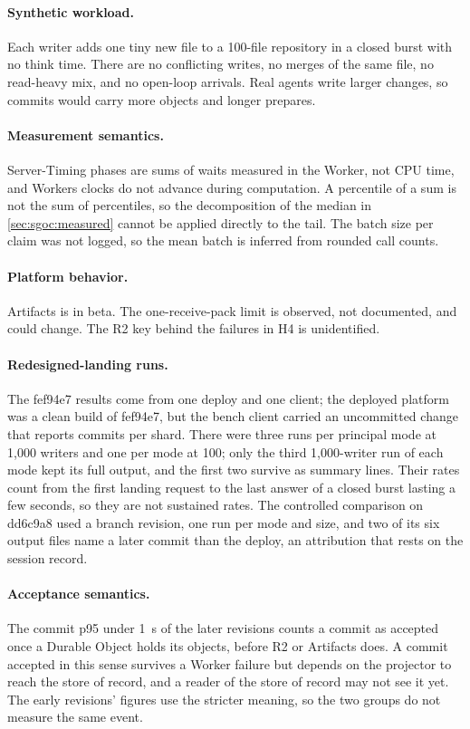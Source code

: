 \documentclass[11pt,letterpaper]{article}
\theoremstyle{definition}
\theoremstyle{remark}
\begin{document}
\paragraph{Synthetic workload.} Each writer adds one tiny new file to a 100-file repository in a closed burst with no think time. There are no conflicting writes, no merges of the same file, no read-heavy mix, and no open-loop arrivals. Real agents write larger changes, so commits would carry more objects and longer prepares.

\paragraph{Measurement semantics.} Server-Timing phases are sums of waits measured in the Worker, not CPU time, and Workers clocks do not advance during computation. A percentile of a sum is not the sum of percentiles, so the decomposition of the median in \cref{sec:sgoc:measured} cannot be applied directly to the tail. The batch size per claim was not logged, so the mean batch is inferred from rounded call counts.

\paragraph{Platform behavior.} Artifacts is in beta. The one-receive-pack limit is observed, not documented, and could change. The R2 key behind the failures in H4 is unidentified.

\paragraph{Redesigned-landing runs.} The fef94e7 results come from one deploy and one client; the deployed platform was a clean build of fef94e7, but the bench client carried an uncommitted change that reports commits per shard. There were three runs per principal mode at 1,000 writers and one per mode at 100; only the third 1,000-writer run of each mode kept its full output, and the first two survive as summary lines. %
Their rates count from the first landing request to the last answer of a closed burst lasting a few seconds, so they are not sustained rates. The controlled comparison on dd6c9a8 used a branch revision, one run per mode and size, and two of its six output files name a later commit than the deploy, an attribution that rests on the session record. %

\paragraph{Acceptance semantics.} The commit p95 under 1~s of the later revisions counts a commit as accepted once a Durable Object holds its objects, before R2 or Artifacts does. %
A commit accepted in this sense survives a Worker failure but depends on the projector to reach the store of record, and a reader of the store of record may not see it yet. The early revisions' figures use the stricter meaning, so the two groups do not measure the same event.
\end{document}

